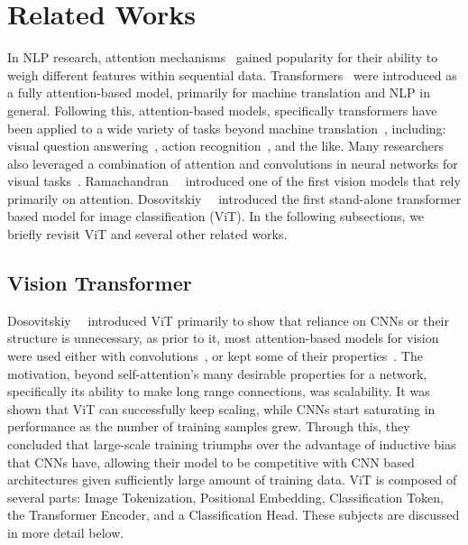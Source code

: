 \documentclass[10pt,twocolumn,letterpaper]{article}
\begin{document}
\section{Related Works}
\label{sec:related}

In NLP research, attention mechanisms~\cite{graves2014neural,bahdanau2016neural,luong2015effective} gained popularity for their ability to weigh different features within sequential data. Transformers~\cite{vaswani2017attention} were introduced as a fully attention-based model, primarily for machine translation and NLP in general.
Following this, attention-based models, specifically transformers have been applied to a wide variety of tasks beyond machine translation~\cite{devlin2019bert,liu2019roberta,yang2019xlnet}, including: visual question answering~\cite{lu2019vilbert,su2019vl}, action recognition~\cite{bertasius2021space,girdhar2019video}, and the like.
Many researchers also leveraged a combination of attention and convolutions in neural networks for visual tasks~\cite{wang2017residual,hu2018squeeze,bello2019attention,zhang2019self}.
Ramachandran~\etal~\cite{ramachandran2019stand} introduced one of the first vision models that rely primarily on attention.
Dosovitskiy~\etal~\cite{dosovitskiy2020image} introduced the first stand-alone transformer based model for image classification (ViT). In the following subsections, we briefly revisit ViT and several other related works.

\subsection{Vision Transformer}
\label{subsec:vits}
Dosovitskiy~\etal~\cite{dosovitskiy2020image} introduced ViT primarily to show that reliance on CNNs or their structure is unnecessary, as prior to it, most attention-based models for vision were used either with convolutions~\cite{wang2017residual,bello2019attention,zhang2019self,carion2020end}, or kept some of their properties~\cite{ramachandran2019stand}.
The motivation, beyond self-attention's many desirable properties for a network, specifically its ability to make long range connections, was scalability. It was shown that ViT can successfully keep scaling, while CNNs start saturating in performance as the number of training samples grew.
Through this, they concluded that large-scale training triumphs over the advantage of inductive bias that CNNs have, allowing their model to be competitive with CNN based architectures given sufficiently large amount of training data.
ViT is composed of several parts: Image Tokenization, Positional Embedding, Classification Token, the Transformer Encoder, and a Classification Head.
These subjects are discussed in more detail below.
\end{document}
